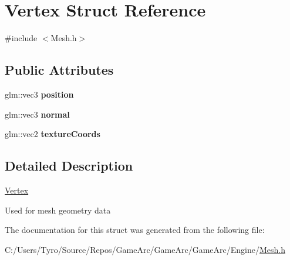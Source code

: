 \hypertarget{struct_vertex}{}\section{Vertex Struct Reference}
\label{struct_vertex}


{\ttfamily \#include $<$Mesh.\+h$>$}

\subsection*{Public Attributes}
\begin{DoxyCompactItemize}
\item 
\mbox{\label{struct_vertex_a030819fdc241743bbd3e180a6b132ed3}} 
glm\+::vec3 {\bfseries position}
\item 
\mbox{\label{struct_vertex_a3aa35fe84025ecf1acccb5f65f5577fd}} 
glm\+::vec3 {\bfseries normal}
\item 
\mbox{\label{struct_vertex_a03ba1fdd25400383cd40bd2153d08ef1}} 
glm\+::vec2 {\bfseries texture\+Coords}
\end{DoxyCompactItemize}


\subsection{Detailed Description}
\mbox{\hyperlink{struct_vertex}{Vertex}}

Used for mesh geometry data 

The documentation for this struct was generated from the following file\+:\begin{DoxyCompactItemize}
\item 
C\+:/\+Users/\+Tyro/\+Source/\+Repos/\+Game\+Arc/\+Game\+Arc/\+Game\+Arc/\+Engine/\mbox{\hyperlink{_mesh_8h}{Mesh.\+h}}\end{DoxyCompactItemize}
